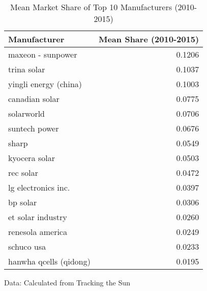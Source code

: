 \begin{table}[!t]
\caption*{
{\large Mean Market Share of Top 10 Manufacturers (2010-2015)}
} 
\fontsize{12.0pt}{14.4pt}\selectfont
\begin{tabular*}{\linewidth}{@{\extracolsep{\fill}}lr}
\toprule
Manufacturer & Mean Share (2010-2015) \\ 
\midrule\addlinespace[2.5pt]
maxeon - sunpower & 0.1206 \\ 
trina solar & 0.1037 \\ 
yingli energy (china) & 0.1003 \\ 
canadian solar & 0.0775 \\ 
solarworld & 0.0706 \\ 
suntech power & 0.0676 \\ 
sharp & 0.0549 \\ 
kyocera solar & 0.0503 \\ 
rec solar & 0.0472 \\ 
lg electronics inc. & 0.0397 \\ 
bp solar & 0.0306 \\ 
et solar industry & 0.0260 \\ 
renesola america & 0.0249 \\ 
schuco usa & 0.0233 \\ 
hanwha qcells (qidong) & 0.0195 \\ 
\bottomrule
\end{tabular*}
\begin{minipage}{\linewidth}
Data: Calculated from Tracking the Sun\\
\end{minipage}
\end{table}
